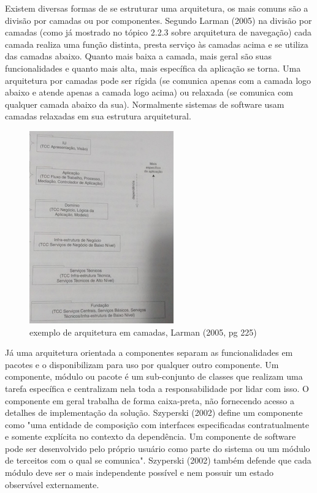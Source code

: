 Existem diversas formas de se estruturar uma arquitetura, os mais comuns são a divisão por camadas ou por componentes. Segundo Larman (2005) na divisão por camadas (como já mostrado no tópico 2.2.3 sobre arquitetura de navegação) cada camada realiza uma função distinta, presta serviço às camadas acima e se utiliza das camadas abaixo. Quanto mais baixa a camada, mais geral são suas funcionalidades e quanto mais alta, mais específica da aplicação se torna. Uma arquitetura por camadas pode ser rígida (se comunica apenas com a camada logo abaixo e atende apenas a camada logo acima) ou relaxada (se comunica com qualquer camada abaixo da sua). Normalmente sistemas de software usam camadas relaxadas em sua estrutura arquitetural.

\begin{figure}[h]
	\centering
	\label{fig11}
		\includegraphics[keepaspectratio=true,scale=0.5]{figuras/arqcamadas.jpg}
	\caption{exemplo de arquitetura em camadas, Larman (2005, pg 225)}
\end{figure}

Já uma arquitetura orientada a componentes separam as funcionalidades em pacotes e o disponibilizam para uso por qualquer outro componente. Um componente, módulo ou pacote é um sub-conjunto de classes que realizam uma tarefa específica e centralizam nela toda a responsabilidade por lidar com isso. O componente em geral trabalha de forma caixa-preta, não fornecendo acesso a detalhes de implementação da solução. Szyperski (2002) define um componente como "uma entidade de composição com interfaces especificadas contratualmente e somente explícita no contexto da dependência. Um componente de software pode ser desenvolvido pelo próprio usuário como parte do sistema ou um módulo de terceitos com o qual se comunica". Szyperski (2002) também defende que cada módulo deve ser o mais independente possível e nem possuir um estado observável externamente.

